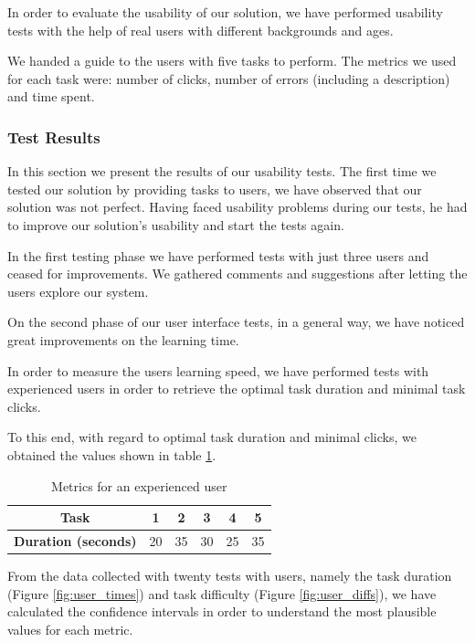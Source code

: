 \documentclass[conference,compsoc,a4paper]{IEEEtran}
\begin{document}
      In order to evaluate the usability of our solution, we have performed usability tests with the help of real users with different backgrounds and ages.

      We handed a guide to the users with five tasks to perform. The metrics we used for each task were: number of clicks, number of errors (including a description) and time spent. 

  \subsubsection{Test Results}

In this section we present the results of our usability tests. The first time we tested our solution by providing tasks to users, we have observed that our solution was not perfect. Having faced usability problems during our tests, he had to improve our solution's usability and start the tests again.


In the first testing phase we have performed tests with just three users and ceased for improvements. We gathered comments and suggestions after letting the users explore our system.

On the second phase of our user interface tests, in a general way, we have noticed great improvements on the learning time.

In order to measure the users learning speed, we have performed tests with experienced users in order to retrieve the optimal task duration and minimal task clicks.

To this end, with regard to optimal task duration and minimal clicks, we obtained the values shown in table \ref{table:optimal}.


\begin{table}[H]
\centering
\caption{Metrics for an experienced user}
\label{table:optimal}
\begin{tabular}{|c|c|c|c|c|c|}
\hline
\textbf{Task} & 1 & 2 & 3 & 4 & 5 \\ \hline
\textbf{Duration (seconds)} & 20 & 35 & 30 & 25 & 35 \\ \hline
\end{tabular}
\end{table}


From the data collected with twenty tests with users, namely the task duration (Figure \ref{fig:user_times}) and task difficulty (Figure \ref{fig:user_diffs}), we have calculated the confidence intervals in order to understand the most plausible values for each metric.
\end{document}
